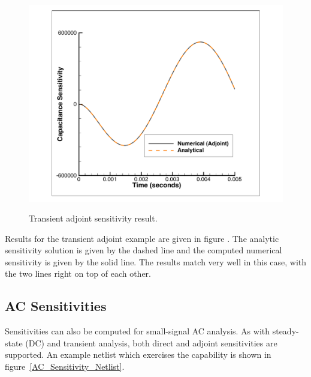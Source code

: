 \begin{figure}[ht]
  \centering
  \scalebox{0.5}
  {\includegraphics[]{sensCapGearAdj}}
  \caption[Transient adjoint sensitivity result]
  {Transient adjoint sensitivity result.
\label{transientAdjointSensitivityResult}}
\end{figure}
Results for the transient adjoint example are given in figure .
The analytic sensitivity solution is given by the dashed line and the computed numerical
sensitivity is given by the solid line.  The results match very well in this case,
with the two lines right on top of each other.

\clearpage
\subsection{AC Sensitivities}
Sensitivities can also be computed for small-signal AC analysis.  As with steady-state (DC) 
and transient analysis, both direct and adjoint sensitivities are supported.     An example
netlist which exercises the capability is shown in figure~\ref{AC_Sensitivity_Netlist}.

